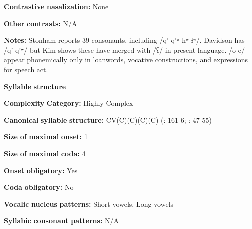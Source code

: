 \documentclass[output=paper]{langsci/langscibook}
\begin{document}
\begin{styleBody}
\textbf{Contrastive} \textbf{nasalization:} None
\end{styleBody}

\begin{styleBody}
\textbf{Other} \textbf{contrasts:} N/A
\end{styleBody}

\begin{styleBody}
\textbf{Notes:} Stonham reports 39 consonants, including /q’ q’ʷ ħʷ ɬʷ/. Davidson has /q’ q’ʷ/ but Kim shows these have merged with /ʕ/ in present language. /o e/ appear phonemically only in loanwords, vocative constructions, and expressions for speech act.
\end{styleBody}

\begin{styleBody}
\textbf{Syllable} \textbf{structure}
\end{styleBody}

\begin{styleBody}
\textbf{Complexity} \textbf{Category:} Highly Complex
\end{styleBody}

\begin{styleBody}
\textbf{Canonical} \textbf{syllable} \textbf{structure:} CV(C)(C)(C)(C) (\citealt{Kim2003}: 161-6; \citealt{Stonham1999}: 47-55)
\end{styleBody}

\begin{styleBody}
\textbf{Size} \textbf{of} \textbf{maximal} \textbf{onset:} 1
\end{styleBody}

\begin{styleBody}
\textbf{Size} \textbf{of} \textbf{maximal} \textbf{coda:} 4
\end{styleBody}

\begin{styleBody}
\textbf{Onset} \textbf{obligatory:} Yes
\end{styleBody}

\begin{styleBody}
\textbf{Coda} \textbf{obligatory:} No
\end{styleBody}

\begin{styleBody}
\textbf{Vocalic} \textbf{nucleus} \textbf{patterns:} Short vowels, Long vowels
\end{styleBody}

\begin{styleBody}
\textbf{Syllabic} \textbf{consonant} \textbf{patterns:} N/A
\end{styleBody}
\end{document}
